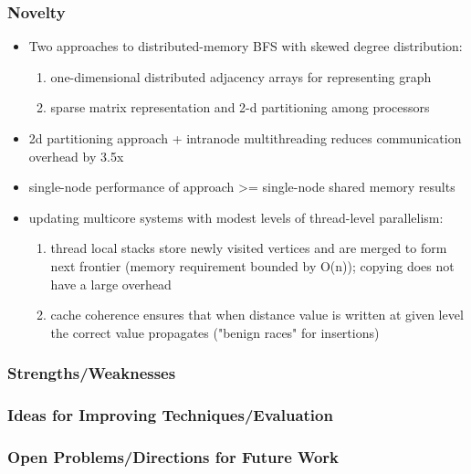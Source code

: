 \subsubsection{Novelty}

\begin{itemize}
    \item Two approaches to distributed-memory BFS with skewed degree distribution:
    \begin{enumerate}
        \item one-dimensional distributed adjacency arrays for representing graph
        \item sparse matrix representation and 2-d partitioning among processors
    \end{enumerate}
    \item 2d partitioning approach + intranode multithreading reduces communication overhead by 3.5x
    \item single-node performance of approach >= single-node shared memory results
    \item updating multicore systems with modest levels of thread-level parallelism:
    \begin{enumerate}
        \item thread local stacks store newly visited vertices and are merged to form next frontier (memory requirement bounded by O(n)); copying does not have a large overhead
        \item cache coherence ensures that when distance value is written at given level the correct value propagates ("benign races" for insertions)
    \end{enumerate}
\end{itemize}

\subsubsection{Strengths/Weaknesses}


\subsubsection{Ideas for Improving Techniques/Evaluation}


\subsubsection{Open Problems/Directions for Future Work}


